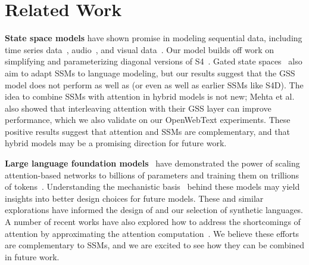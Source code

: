 
\section{Related Work}
\label{sec:related}

\textbf{State space models} have shown promise in modeling sequential data, including time series data~\citep{gu2022efficiently}, audio~\citep{goel2022s}, and visual data~\citep{nguyen2022s4nd}.
Our model builds off work on simplifying and parameterizing diagonal versions of S4~\citep{gu2022parameterization,gupta2022diagonal, gu2022train}.
Gated state spaces~\citep{mehta2022long} also aim to adapt SSMs to language modeling, but our results suggest that the GSS model does not perform as well as \hthree (or even as well as earlier SSMs like S4D).
The idea to combine SSMs with attention in hybrid models is not new; Mehta et al.~\citep{mehta2022long} also showed that interleaving attention with their GSS layer can improve performance, which we also validate on our OpenWebText experiments.
These positive results suggest that attention and SSMs are complementary, and that hybrid models may be a promising direction for future work.

\textbf{Large language foundation models}~\citep{bommasani2021opportunities} have demonstrated the power of scaling attention-based networks to billions of parameters and training them on trillions of tokens~\citep{hoffmann2022training}.
Understanding the mechanistic basis~\citep{elhage2021mathematical} behind these models may yield insights into better design choices for future models.
These and similar explorations have informed the design of \hthree and our selection of synthetic languages.
A number of recent works have also explored how to address the shortcomings of attention by approximating the attention computation~\citep{wang2020linformer,katharopoulos2020transformers, choromanski2020rethinking,tay2020long, kitaev2020reformer, daras2020smyrf}.
We believe these efforts are complementary to SSMs, and we are excited to see how they can be combined in future work.

